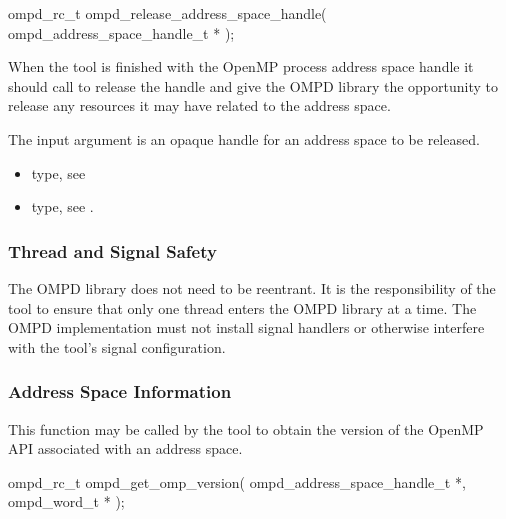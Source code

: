 \format

\begin{cspecific}
\begin{ompSyntax}
ompd_rc_t ompd_release_address_space_handle(
  ompd_address_space_handle_t *
);
\end{ompSyntax}
\end{cspecific}


\descr
When the tool is finished with the OpenMP process address space handle it
should call  to release
the handle and give the OMPD library the opportunity to release
any resources it may have related to the address space.

\argdesc
The input argument  is an opaque handle for an address space
to be released.

\crossreferences
\begin{itemize}
	\item {} type, see 
	\item {} type, see .
\end{itemize}

\subsubsection{Thread and Signal Safety}

The OMPD library does not need to be reentrant. It is the responsibility
of the tool to ensure that only one thread enters the OMPD library at a time. The OMPD
implementation must not install signal handlers or otherwise interfere with the tool's signal
configuration.


\subsubsection{Address Space Information}

\label{subsubsubsec:ompd_get_omp_version}

\summary
This function may be called by the tool to obtain the version of the OpenMP
API associated with an address space.

\format

\begin{cspecific}
\begin{ompSyntax}
ompd_rc_t ompd_get_omp_version(
  ompd_address_space_handle_t *,
  ompd_word_t *
);
\end{ompSyntax}
\end{cspecific}

